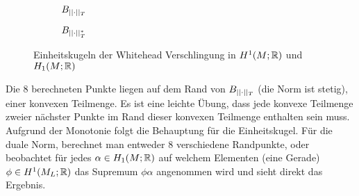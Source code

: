         \begin{figure}[H]
        \centering
        \begin{subfigure}[l]{0.4\textwidth}
                \caption{$B_{||\cdot||_T}$}
        
        
        \end{subfigure}    
        \hfill
    \begin{subfigure}[r]{0.4\textwidth}
    \caption{$B_{||\cdot||_T^*}$}

    \end{subfigure}
    \caption{Einheitskugeln der Whitehead Verschlingung in $H^1(M;\mathbb{R})$ und $H_1(M;\mathbb{R})$}
    \end{figure}
    Die $8$ berechneten Punkte liegen auf dem Rand von $B_{||\cdot||_T}$ (die Norm ist stetig), einer konvexen Teilmenge. Es ist eine leichte Übung, dass jede konvexe Teilmenge zweier nächster Punkte im Rand dieser konvexen Teilmenge enthalten sein muss. Aufgrund der Monotonie folgt die Behauptung für die Einheitskugel. Für die duale Norm, berechnet man entweder $8$ verschiedene Randpunkte, oder beobachtet für jedes $\alpha \in H_1(M;\mathbb{R})$ auf welchem Elementen (eine Gerade) $\phi \in H^1(M_L;\mathbb{R})$ das Supremum $\phi \alpha$ angenommen wird und sieht direkt das Ergebnis.
